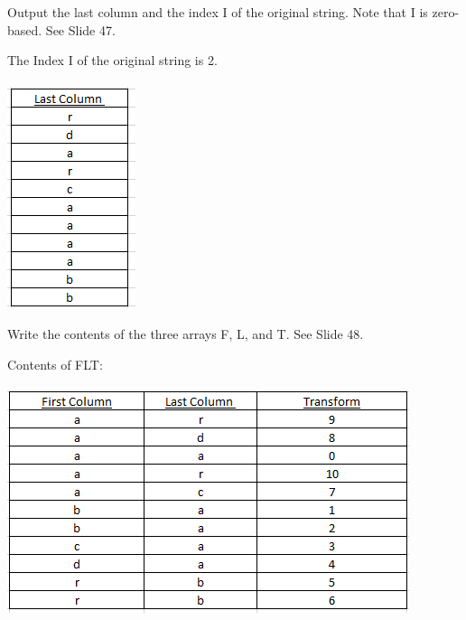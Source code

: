 \documentclass[10pt]{article}
\newenvironment{exercise}[2][Exercise]{\begin{trivlist}
\item[\hskip \labelsep {\bfseries #1}\hskip \labelsep {\bfseries #2.}]}{\end{trivlist}}
\newenvironment{solution}[2][Solution]{\begin{trivlist}
\item[\hskip \labelsep {\bfseries #1}\hskip \labelsep {\bfseries #2.}]}{\end{trivlist}}
\theoremstyle{definition}
\begin{document}
\begin{exercise}{(2C)}
Output the last column and the index I of the original string. Note that I is zero-based.
See Slide 47.
\end{exercise}

\begin{solution}{(2C)}
The Index I of the original string is 2. \\
\\
\includegraphics{lastcolumn.PNG}\\
\end{solution}

\begin{exercise}{(2D)}
Write the contents of the three arrays F, L, and T. See Slide 48.
\end{exercise}

\begin{solution}{(2D)}
Contents of FLT:\\
\\
\includegraphics{flt.PNG}\\
\end{solution}


 
\end{document}
